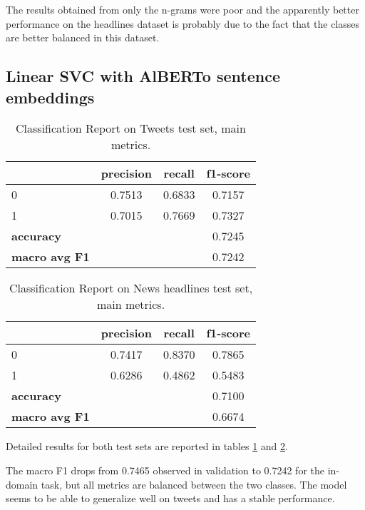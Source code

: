 \documentclass[a4paper, 9pt, twocolumn, DIV=calc]{scrartcl}
\begin{document}
The results obtained from only the n-grams were poor and the apparently better performance on the headlines dataset is probably due to the fact that the classes are better balanced in this dataset.

\subsection{Linear SVC with AlBERTo sentence embeddings}

\begin{table}
    \small
    \centering
    \begin{tabular}{lccc}
        \toprule
        & \textbf{precision} & \textbf{recall} & \textbf{f1-score}  \\
        \midrule
        0 & 0.7513 & 0.6833 & 0.7157 \\
        1 & 0.7015 & 0.7669 & 0.7327 \\
        \midrule
        \textbf{accuracy} & & & 0.7245 \\
        \textbf{macro avg F1} &  &  & 0.7242 \\
        \bottomrule
    \end{tabular}
    \caption{Classification Report on Tweets test set, main metrics.}
    \label{tab:classification_report_svm_alberto_tweets}
\end{table}

\begin{table}
    \small
    \centering
    \begin{tabular}{lccc}
        \toprule
        & \textbf{precision} & \textbf{recall} & \textbf{f1-score} \\
        \midrule
        0 & 0.7417 & 0.8370 & 0.7865 \\
        1 & 0.6286 & 0.4862 & 0.5483 \\
        \midrule
        \textbf{accuracy} & & & 0.7100 \\
        \textbf{macro avg F1} & & & 0.6674 \\
        \bottomrule
    \end{tabular}
    \caption{Classification Report on News headlines test set, main metrics.}
    \label{tab:classification_report_svm_alberto_news}
\end{table}

Detailed results for both test sets are reported in tables \ref{tab:classification_report_svm_alberto_tweets} and \ref{tab:classification_report_svm_alberto_news}.

The macro F1 drops from 0.7465 observed in validation to 0.7242 for the in-domain task, but all metrics are balanced between the two classes. The model seems to be able to generalize well on tweets and has a stable performance.
\end{document}
